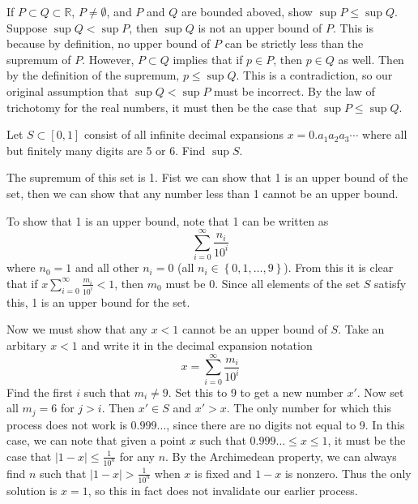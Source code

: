 \documentclass[10pt]{amsart}
\theoremstyle{plain}
\newenvironment{exercise}[1]{%
  \renewcommand\themanualtheoreminner{#1}%
  \manualtheoreminner
}{\endmanualtheoreminner}
\theoremstyle{definition}
\newcommand{\<}{\langle}
\renewcommand{\>}{\rangle}
\begin{document}
\begin{exercise}{1.3.3}
	If $P \subset Q \subset \mathbb{R}$, $P \neq \emptyset$, and  $P$ and $Q$ are bounded aboved, show $\sup P \leq \sup Q$.
\end{exercise}
Suppose $\sup Q < \sup P$, then $\sup Q$ is not an upper bound of $P$. This is because by definition, no upper bound of $P$ can be strictly less than the supremum of $P$.
However, $P \subset Q$ implies that if $p \in P$, then $p \in Q$ as well. Then by the definition of the supremum, $p \leq \sup Q$. This is a contradiction, so our original assumption that $\sup Q < \sup P$ must be incorrect. By the law of trichotomy for the real numbers, it must then be the case that $\sup P \leq \sup Q$.

\begin{exercise}{1.3.5}
	Let $S \subset [0,1]$ consist of all infinite decimal expansions $x=0.a_1 a_2 a_3 \cdots$ where all but finitely many digits are 5 or 6. Find $\sup S$.
\end{exercise}

The supremum of this set is 1. Fist we can show that 1 is an upper bound of the set, then we can show that any number less than 1 cannot be an upper bound.

To show that 1 is an upper bound, note that 1 can be written as
\[
\sum_{i=0}^{\infty} \frac{n_i}{10^i}
\]
where $n_0 = 1$ and all other $n_i = 0$ (all $n_i \in \left\{ 0, 1, \dots, 9 \right\}$). From this it is clear that if $x \sum_{i=0}^{\infty} \frac{m_i}{10^i} < 1$, then $m_0$ must be 0. Since all elements of the set $S$ satisfy this, 1 is an upper bound for the set.

Now we must show that any $x < 1$ cannot be an upper bound of $S$. Take an arbitary $x < 1$ and write it in the decimal expansion notation
\[
x = \sum_{i=0}^{\infty} \frac{m_i}{10^i}
\] 
Find the first $i$ such that $m_i \neq 9$. Set this to 9 to get a new number $x'$. Now set all $m_j = 6$ for $j>i$. Then $x' \in S$ and $x' > x$. The only number for which this process does not work is $0.999\dots$, since there are no digits not equal to 9. In this case, we can note that given a point $x$ such that $0.999\dots \leq x \leq 1$, it must be the case that $|1 - x| \leq \frac{1}{10^n} $ for any $n$. By the Archimedean property, we can always find $n$ such that $|1-x| > \frac{1}{10^n} $ when $x$ is fixed and $1-x$ is nonzero. Thus the only solution is $x=1$, so this in fact does not invalidate our earlier process.
\end{document}
